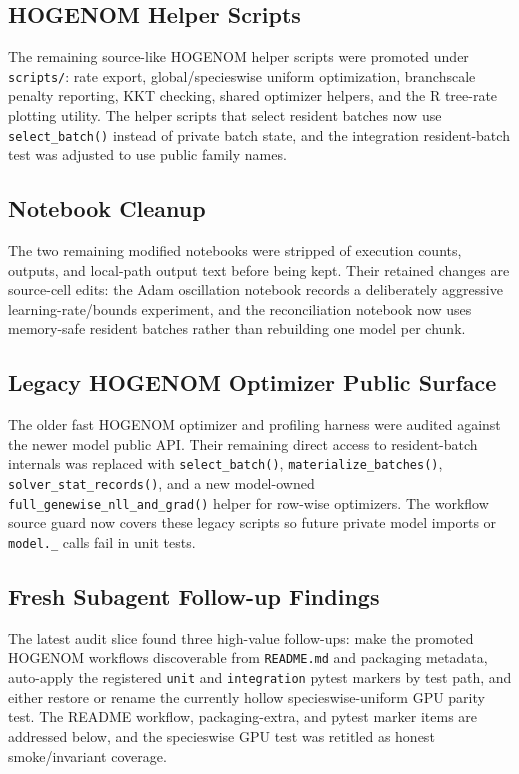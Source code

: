 \documentclass[11pt]{article}
\begin{document}
\subsection{HOGENOM Helper Scripts}

The remaining source-like HOGENOM helper scripts were promoted under
\texttt{scripts/}: rate export, global/specieswise uniform optimization,
branchscale penalty reporting, KKT checking, shared optimizer helpers, and the
R tree-rate plotting utility.  The helper scripts that select resident batches
now use \texttt{select\_batch()} instead of private batch state, and the
integration resident-batch test was adjusted to use public family names.

\subsection{Notebook Cleanup}

The two remaining modified notebooks were stripped of execution counts,
outputs, and local-path output text before being kept.  Their retained changes
are source-cell edits: the Adam oscillation notebook records a deliberately
aggressive learning-rate/bounds experiment, and the reconciliation notebook now
uses memory-safe resident batches rather than rebuilding one model per chunk.

\subsection{Legacy HOGENOM Optimizer Public Surface}

The older fast HOGENOM optimizer and profiling harness were audited against
the newer model public API.  Their remaining direct access to resident-batch
internals was replaced with \texttt{select\_batch()},
\texttt{materialize\_batches()}, \texttt{solver\_stat\_records()}, and a new
model-owned \texttt{full\_genewise\_nll\_and\_grad()} helper for row-wise
optimizers.  The workflow source guard now covers these legacy scripts so
future private model imports or \texttt{model.\_} calls fail in unit tests.

\subsection{Fresh Subagent Follow-up Findings}

The latest audit slice found three high-value follow-ups: make the promoted
HOGENOM workflows discoverable from \texttt{README.md} and packaging metadata,
auto-apply the registered \texttt{unit} and \texttt{integration} pytest markers
by test path, and either restore or rename the currently hollow
specieswise-uniform GPU parity test.  The README workflow, packaging-extra,
and pytest marker items are addressed below, and the specieswise GPU test was
retitled as honest smoke/invariant coverage.
\end{document}
